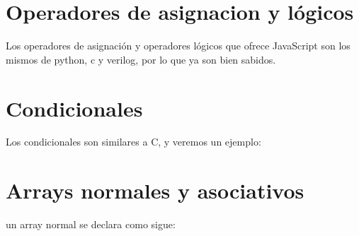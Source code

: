 

\section{Operadores de asignacion y l\'ogicos}

Los operadores de asignaci\'on y operadores l\'ogicos que ofrece JavaScript son los mismos de python, c y verilog, por lo que ya son bien sabidos.

\section{Condicionales}
Los condicionales son similares a C, y veremos un ejemplo:



\section{Arrays normales y asociativos}

un array normal se declara como sigue:

